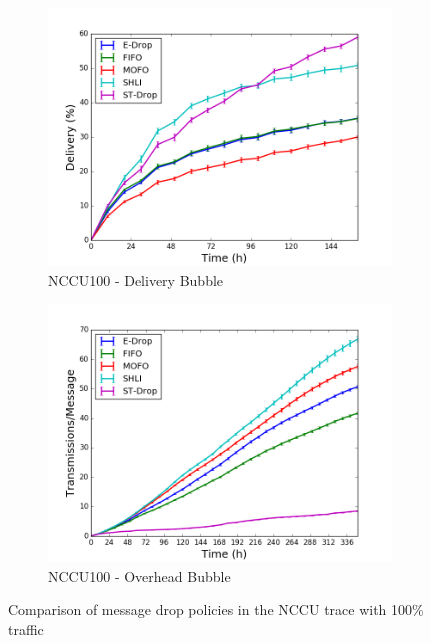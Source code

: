 \begin{figure}
    \begin{subfigure}[b]{0.5\columnwidth}
        \includegraphics[width=\linewidth]{imgs/nccu/100/BubbleRap-delivery.png}
        \caption{NCCU100 - Delivery Bubble}
        \label{fig:nccu100BubbleDel}
    \end{subfigure}
    \begin{subfigure}[b]{0.5\columnwidth}
        \includegraphics[width=\linewidth]{imgs/nccu/100/BubbleRap-overhead.png}
        \caption{NCCU100 - Overhead Bubble}
        \label{fig:nccu100BubbleOver}
    \end{subfigure}

    \caption{Comparison of message drop policies in the NCCU trace with 100\% traffic}
    \label{fig:nccu100}
\end{figure}

